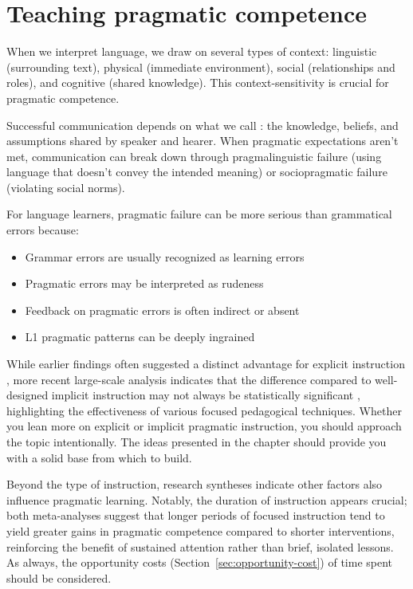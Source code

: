 \section{Teaching pragmatic competence}

When we interpret language, we draw on several types of context: linguistic (surrounding text), physical (immediate environment), social (relationships and roles), and cognitive (shared knowledge). This context-sensitivity is crucial for pragmatic competence.

Successful communication depends on what we call : the knowledge, beliefs, and assumptions shared by speaker and hearer. When pragmatic expectations aren't met, communication can break down through pragmalinguistic failure (using language that doesn't convey the intended meaning) or sociopragmatic failure (violating social norms).

For language learners, pragmatic failure can be more serious than grammatical errors because:
\begin{itemize}[noitemsep]
    \item Grammar errors are usually recognized as learning errors
    \item Pragmatic errors may be interpreted as rudeness
    \item Feedback on pragmatic errors is often indirect or absent
    \item L1 pragmatic patterns can be deeply ingrained
\end{itemize}


While earlier findings often suggested a distinct advantage for explicit instruction \autocite{JeonKaya2006}, more recent large-scale analysis indicates that the difference compared to well-designed implicit instruction may not always be statistically significant \autocite{RenLiLu2022}, highlighting the effectiveness of various focused pedagogical techniques. Whether you lean more on explicit or implicit pragmatic instruction, you should approach the topic intentionally. The ideas presented in the chapter should provide you with a solid base from which to build.

Beyond the type of instruction, research syntheses indicate other factors also influence pragmatic learning. Notably, the duration of instruction appears crucial; both meta-analyses suggest that longer periods of focused instruction tend to yield greater gains in pragmatic competence compared to shorter interventions, reinforcing the benefit of sustained attention rather than brief, isolated lessons. As always, the opportunity costs (Section~\ref{sec:opportunity-cost}) of time spent should be considered.

